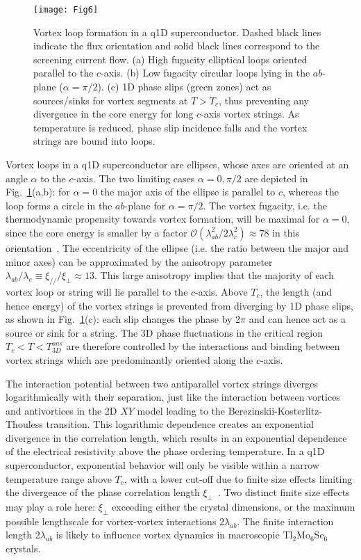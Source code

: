 \documentclass[prb,twocolumn,showpacs,preprintnumbers,amsmath,amssymb,floatfix,groupedaddress,superscriptaddress,aps,10pt]{revtex4-1}
\newcommand{\Tl}{Tl$_2$Mo$_6$Se$_6$}
\begin{document}
{\begin{figure}[tbp]
	\centering 
	\texttt{[image: Fig6]}
	\caption{\label{Fig6} Vortex loop formation in a q1D superconductor.  Dashed black lines indicate the flux orientation and solid black lines correspond to the screening current flow.  (a) High fugacity elliptical loops oriented parallel to the $c$-axis.  (b) Low fugacity circular loops lying in the $ab$-plane ($\alpha=\pi/2$).  (c) 1D phase slips (green zones) act as sources/sinks for vortex segments at $T>T_c$, thus preventing any divergence in the core energy for long $c$-axis vortex strings.  As temperature is reduced, phase slip incidence falls and the vortex strings are bound into loops.}
\end{figure}

Vortex loops in a q1D superconductor are ellipses, whose axes are oriented at an angle $\alpha$ to the $c$-axis.  The two limiting cases $\alpha=0,\pi/2$ are depicted in Fig.~\ref{Fig6}(a,b): for $\alpha=0$ the major axis of the ellipse is parallel to $c$, whereas the loop forms a circle in the $ab$-plane for $\alpha=\pi/2$.  The vortex fugacity, i.e. the thermodynamic propensity towards vortex formation, will be maximal for $\alpha=0$, since the core energy is smaller by a factor $\mathcal{O}(\lambda_{ab}^2/2\lambda_c^2)\approx78$ in this orientation~\cite{Shenoy1995,Petrovic2010}.  The eccentricity of the ellipse (i.e. the ratio between the major and minor axes) can be approximated by the anisotropy parameter $\lambda_{ab}/\lambda_c\equiv\xi_{/\!/}/\xi_\perp\approx13$.  This large anisotropy implies that the majority of each vortex loop or string will lie parallel to the $c$-axis.  Above $T_c$, the length (and hence energy) of the vortex strings is prevented from diverging by 1D phase slips, as shown in Fig.~\ref{Fig6}(c): each slip changes the phase by 2$\pi$ and can hence act as a source or sink for a string.  The 3D phase fluctuations in the critical region $T_c<T<T_{3D}^{ons}$ are therefore controlled by the interactions and binding between vortex strings which are predominantly oriented along the $c$-axis.  

The interaction potential between two antiparallel vortex strings diverges logarithmically with their separation, just like the interaction between vortices and antivortices in the 2D $XY$ model leading to the Berezinskii-Kosterlitz-Thouless transition. This logarithmic dependence creates an exponential divergence in the correlation length, which results in an exponential dependence of the electrical resistivity above the phase ordering temperature.  In a q1D superconductor, exponential behavior will only be visible within a narrow temperature range above $T_c$, with a lower cut-off due to finite size effects limiting the divergence of the phase correlation length $\xi_\perp$~\cite{Holzer2001}.  Two distinct finite size effects may play a role here: $\xi_\perp$ exceeding either the crystal dimensions, or the maximum possible lengthscale for vortex-vortex interactions 2$\lambda_{ab}$.  The finite interaction length 2$\lambda_{ab}$ is likely to influence vortex dynamics in macroscopic {\Tl} crystals.  

}
\end{document}
